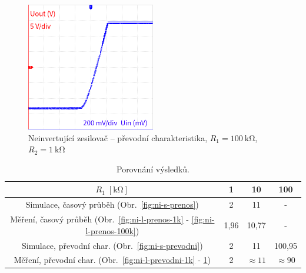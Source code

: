 \documentclass{protokol}
\begin{document}
\begin{figure}[h!]
	\centering
	\includegraphics[width=0.5\textwidth]{oscilo/output10.png}
	\centering
	\caption{Neinvertující zesilovač -- převodní charakteristika, $R_1=\SI{100}{\kilo\ohm}$, $R_2=\SI{1}{\kilo\ohm}$}
	\label{fig:ni-l-prevodni-100k}
\end{figure}

\begin{table}[h!]
	\centering
	\def\arraystretch{1.4}
	\centering
	\begin{tabular}{|c|c|c|c|}	
		\hline
		$R_1 \; [\unit{\kilo\ohm}]$ & 1 & 10 & 100 \\ [0.1ex]
		\hline
		Simulace, časový průběh (Obr.~\ref{fig:ni-s-prenos})   &2  & 11 & -\\ [0.1ex]
		\hline 
		Měření, časový průběh (Obr.~\ref{fig:ni-l-prenos-1k} - \ref{fig:ni-l-prenos-100k}) & 1,96 & 10,77 &  -\\[0.1ex]
		\hline
		Simulace, převodní char. (Obr.~\ref{fig:ni-s-prevodni})   & 2  & 11 & 100,95\\ [0.1ex]
		\hline 
		Měření, převodní char. (Obr.~\ref{fig:ni-l-prevodni-1k} - \ref{fig:ni-l-prevodni-100k})   & 2  & $ \approx 11 $ & $ \approx90 $\\ [0.1ex]
		\hline 
	\end{tabular}
	\caption{Porovnání výsledků.}
	\label{tab:hodnoty-zesileni-ni}
\end{table}


	
\clearpage
\end{document}
